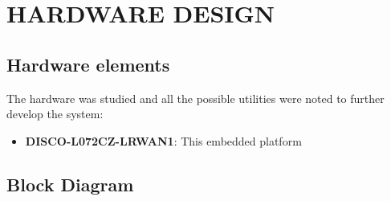\section{HARDWARE DESIGN}
\subsection{Hardware elements}
The hardware was studied and all the possible utilities were noted to further develop the system:
\begin{itemize}
    \item \textbf{DISCO-L072CZ-LRWAN1}: This embedded platform 
\end{itemize} 


\subsection{Block Diagram}
